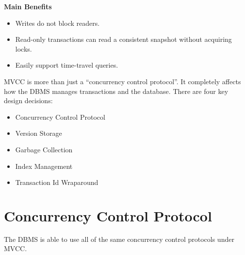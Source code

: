 \documentclass[11pt]{article}
\begin{document}
\textbf{Main Benefits}
\begin{itemize}
    \item Writes do not block readers.
    \item Read-only transactions can read a consistent snapshot without acquiring locks.
    \item Easily support time-travel queries.
\end{itemize}

MVCC is more than just a ``concurrency control protocol''. It completely affects how the 
DBMS manages transactions and the database. There are four key design decisions:~\cite{p781-wu}
\begin{itemize}
    \item Concurrency Control Protocol
    \item Version Storage
    \item Garbage Collection
    \item Index Management
    \item Transaction Id Wraparound
\end{itemize}

\section{Concurrency Control Protocol}
The DBMS is able to use all of the same concurrency control protocols under MVCC.
\end{document}
